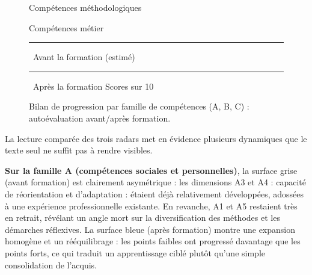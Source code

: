 \begin{figure}[ht]
\begin{minipage}[t]{0.32\textwidth}
\par{}\par{\footnotesize Compétences méthodologiques}
\end{minipage}
\hfill
\begin{minipage}[t]{0.32\textwidth}
\centering
{}
\par{}\par{\footnotesize Compétences métier}
\end{minipage}

\bigskip
\begin{center}
\textcolor{gray!60!black}{\rule{0.35cm}{0.35cm}}~\small Avant la formation (estimé)\qquad
\textcolor{hessoBlue}{\rule{0.35cm}{0.35cm}}~\small Après la formation\qquad
\footnotesize Scores sur 10
\end{center}
\caption{Bilan de progression par famille de compétences (A, B, C) : autoévaluation avant/après formation.}
\end{figure}

\medskip

La lecture comparée des trois radars met en évidence plusieurs dynamiques que le texte seul ne suffit pas à rendre visibles.

\textbf{Sur la famille A (compétences sociales et personnelles)}, la surface grise (avant formation) est clairement asymétrique : les dimensions A3 et A4 : capacité de réorientation et d'adaptation : étaient déjà relativement développées, adossées à une expérience professionnelle existante. En revanche, A1 et A5 restaient très en retrait, révélant un angle mort sur la diversification des méthodes et les démarches réflexives. La surface bleue (après formation) montre une expansion homogène et un rééquilibrage : les points faibles ont progressé davantage que les points forts, ce qui traduit un apprentissage ciblé plutôt qu'une simple consolidation de l'acquis.

